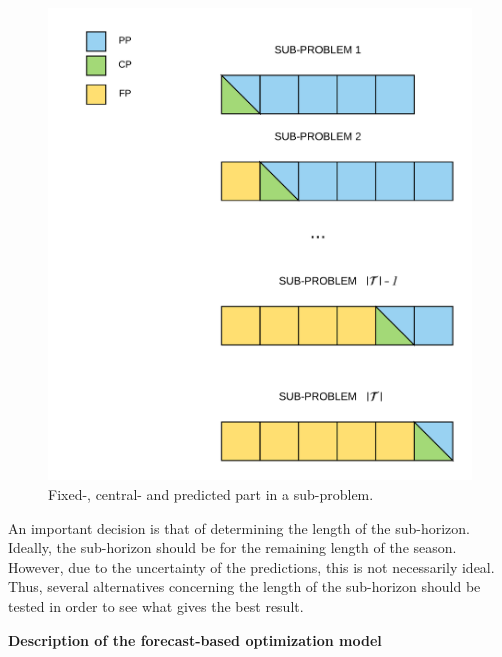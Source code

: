 \begin{figure}[H]
    \centering
    \includegraphics[scale = 0.47]{fig/chapter_5/rolling_horizon.png}
    \caption{Fixed-, central- and predicted part in a sub-problem.}
    \label{fig:rolling_horizon}
\end{figure}

\newpar

An important decision is that of determining the length of the sub-horizon. Ideally, the sub-horizon should be for the remaining length of the season. However, due to the uncertainty of the predictions, this is not necessarily ideal. Thus, several alternatives concerning the length of the sub-horizon should be tested in order to see what gives the best result.











\newpar


\textbf{Description of the forecast-based optimization model}

